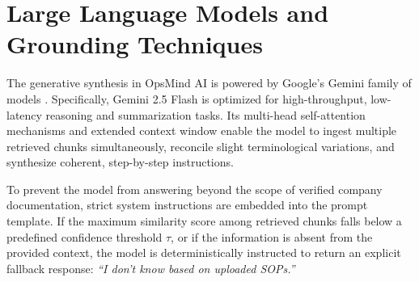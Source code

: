 \section{Large Language Models and Grounding Techniques}
\label{sec:lit_llm_grounding}

The generative synthesis in OpsMind AI is powered by Google's Gemini family of models \cite{geminiteam2023gemini}. Specifically, Gemini 2.5 Flash is optimized for high-throughput, low-latency reasoning and summarization tasks. Its multi-head self-attention mechanisms and extended context window enable the model to ingest multiple retrieved chunks simultaneously, reconcile slight terminological variations, and synthesize coherent, step-by-step instructions.

To prevent the model from answering beyond the scope of verified company documentation, strict system instructions are embedded into the prompt template. If the maximum similarity score among retrieved chunks falls below a predefined confidence threshold $\tau$, or if the information is absent from the provided context, the model is deterministically instructed to return an explicit fallback response: \emph{``I don't know based on uploaded SOPs.''}
